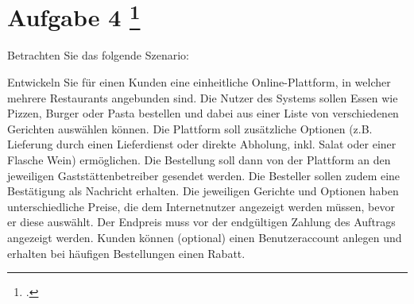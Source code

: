 \documentclass{lehramt-informatik-aufgabe}
\begin{document}
\section{Aufgabe 4
\footcite{66116:2020:09}}

Betrachten Sie das folgende Szenario:

Entwickeln Sie für einen Kunden eine einheitliche Online-Plattform, in
welcher mehrere Restaurants angebunden sind. Die Nutzer des Systems
sollen Essen wie Pizzen, Burger oder Pasta bestellen und dabei aus einer
Liste von verschiedenen Gerichten auswählen können. Die Plattform soll
zusätzliche Optionen (z.B. Lieferung durch einen Lieferdienst oder
direkte Abholung, inkl. Salat oder einer Flasche Wein) ermöglichen. Die
Bestellung soll dann von der Plattform an den jeweiligen
Gaststättenbetreiber gesendet werden. Die Besteller sollen zudem eine
Bestätigung als Nachricht erhalten. Die jeweiligen Gerichte und Optionen
haben unterschiedliche Preise, die dem Internetnutzer angezeigt werden
müssen, bevor er diese auswählt. Der Endpreis muss vor der endgültigen
Zahlung des Auftrags angezeigt werden. Kunden können (optional) einen
Benutzeraccount anlegen und erhalten bei häufigen Bestellungen einen
Rabatt.
\end{document}
